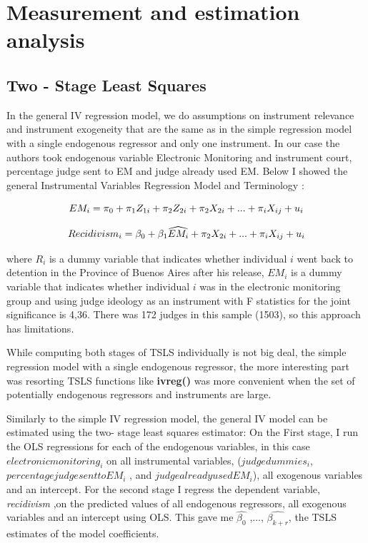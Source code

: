 \documentclass[a4paper,12pt]{article}
\begin{document}
\newpage
\section{Measurement and estimation analysis}
\subsection{Two - Stage Least Squares}

In the general IV regression model, we do assumptions  on instrument relevance and instrument exogeneity that are the same as in the simple regression model with a single endogenous regressor and only one instrument. In our case the authors took endogenous variable Electronic Monitoring and instrument court, percentage judge sent to EM and judge already used EM. Below I showed the general Instrumental Variables Regression Model and Terminology : 

         \begin{equation}
    \centering
    EM_i = \pi_0 + \pi_1Z_{1i} + \pi_2Z_{2i} + \pi_2X_{2i} + ... + \pi_iX_{ij} + u_i  
    \end{equation}
    
        
         \begin{equation}
    \centering
    Recidivism_i = \beta_0 + \beta_1\widehat{EM_i} + \pi_2X_{2i} + ... + \pi_iX_{ij} + u_i  
\end{equation}

where $R_i$ is a dummy variable that indicates whether individual $i$ went back to detention in the Province of Buenos Aires after his release, $EM_i$ is a dummy variable that indicates whether individual $i$ was in the electronic monitoring group and using judge ideology as an instrument with F statistics for the joint significance is 4,36. There was 172 judges in this sample (1503), so this approach has limitations. 

While computing both stages of TSLS individually is not big deal, the simple regression model with a single endogenous regressor, the more interesting part was resorting TSLS functions like \textbf{ivreg()} was more convenient when the set of potentially endogenous regressors and instruments are large. 

Similarly to the simple IV regression model, the general IV model can be estimated using the two- stage least squares estimator: On the First stage, I run the OLS regressions for each of the endogenous variables, in this case $electronic monitoring_i$ on all instrumental variables, ($judge dummies_i$, $percentage judge sent to EM_i$ , and $judge already used EM_i$), all exogenous variables and an intercept. For the second stage I regress the dependent variable, \textit{recidivism} ,on the predicted values of all endogenous regressors, all exogenous variables and an intercept using OLS. This gave me $\widehat{\beta_0}$ ,..., $\widehat{\beta_{k+r}}$, the TSLS estimates of the model coefficients. 
\end{document}
